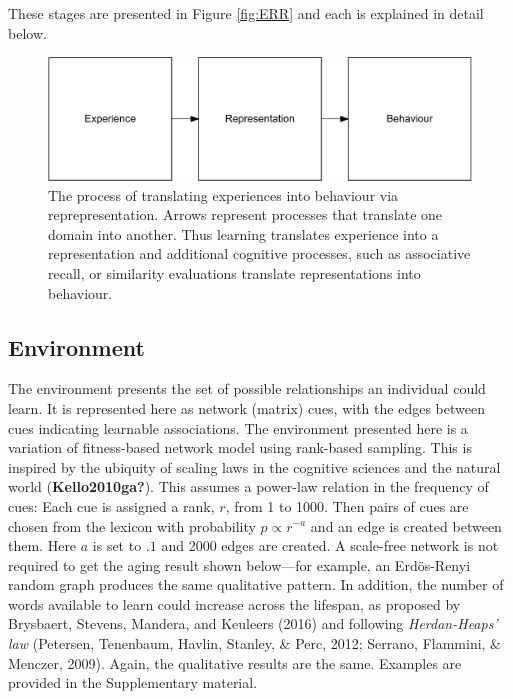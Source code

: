\documentclass[
  man]{apa6}
\begin{document}
These stages are presented in Figure \ref{fig:ERR} and each is explained in detail below.

\begin{figure}
\centering
\includegraphics{Enrichment_files/figure-latex/Figure1-1.pdf}
\caption{\label{fig:Figure1}The process of translating experiences into behaviour via reprepresentation. Arrows represent processes that translate one domain into another. Thus learning translates experience into a representation and additional cognitive processes, such as associative recall, or similarity evaluations translate representations into behaviour.}
\end{figure}

\hypertarget{environment}{%
\subsection{Environment}\label{environment}}

The environment presents the set of possible relationships an individual could learn. It is represented here as network (matrix) cues, with the edges between cues indicating learnable associations. The environment presented here is a variation of fitness-based network model using rank-based sampling. This is inspired by the ubiquity of scaling laws in the cognitive sciences and the natural world (\textbf{Kello2010ga?}). This assumes a power-law relation in the frequency of cues: Each cue is assigned a rank, \(r\), from 1 to 1000. Then pairs of cues are chosen from the lexicon with probability \(p \propto r^{-a}\) and an edge is created between them. Here \(a\) is set to \(.1\) and 2000 edges are created. A scale-free network is not required to get the aging result shown below---for example, an Erdös-Renyi random graph produces the same qualitative pattern. In addition, the number of words available to learn could increase across the lifespan, as proposed by Brysbaert, Stevens, Mandera, and Keuleers (2016) and following \emph{Herdan-Heaps' law} (Petersen, Tenenbaum, Havlin, Stanley, \& Perc, 2012; Serrano, Flammini, \& Menczer, 2009). Again, the qualitative results are the same. Examples are provided in the Supplementary material.
\end{document}
